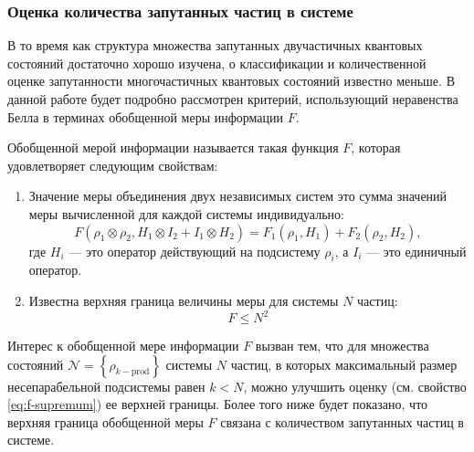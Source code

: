 \subsubsection{Оценка количества запутанных частиц в системе}
В то время как структура множества запутанных двучастичных квантовых состояний достаточно хорошо изучена, 
о классификации и количественной оценке запутанности многочастичных квантовых состояний известно меньше\cite{Plenio2007, Amico2008, Horodecki2009, Guhne2009}. 
%
В данной работе будет подробно рассмотрен критерий, 
использующий  неравенства Белла\cite{Bell1964} в терминах обобщенной меры информации $F$. 

\begin{definition}\label{def:f} 
Обобщенной мерой информации называется такая функция $F$, 
которая удовлетворяет следующим свойствам: 
\begin{enumerate}
  \item Значение меры объединения двух независимых систем это сумма значений меры вычисленной для каждой системы индивидуально:  
  \begin{equation}\label{eq:f-additive-map}
    F(\rho_1 \otimes \rho_2 ,H_1 \otimes I_2 + I_1 \otimes H_2) 
    = F_{1} (\rho_1, H_1) + F_{2} (\rho_2 , H_2), 
  \end{equation}
  где $H_i$ --- это оператор действующий на подсистему $\rho_i$, 
  а $I_i$ --- это единичный оператор. 
  
  \item Известна верхняя граница величины меры для системы $N$ частиц:
  \begin{equation}\label{eq:f-supremum}
    F \leq N^2
  \end{equation}
\end{enumerate}
\end{definition}

Интерес к обобщенной мере информации $F$ вызван тем,
что для множества состояний $\mathcal{N} = \left\{\rho_{k-\mathrm{prod}}\right\}$ системы $N$ частиц, 
в которых максимальный размер несепарабельной подсистемы равен $k < N$, 
можно улучшить оценку (см. свойство \ref{eq:f-supremum}) ее верхней границы.
Более того ниже будет показано, 
что верхняя граница обобщенной меры $F$ связана с количеством запутанных частиц в системе. 

